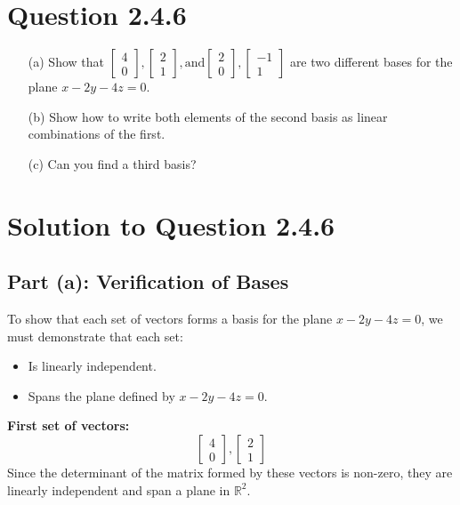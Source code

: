 \documentclass[12pt]{article}
\begin{document}
\newpage
\section*{Question 2.4.6}
\begin{itemize}
    \item[(a)] Show that \(\begin{bmatrix} 4 \\ 0 \end{bmatrix}, \begin{bmatrix} 2 \\ 1 \end{bmatrix}, \text{and} \begin{bmatrix} 2 \\ 0 \end{bmatrix}, \begin{bmatrix} -1 \\ 1 \end{bmatrix}\) are two different bases for the plane \(x - 2y - 4z = 0\).
    \item[(b)] Show how to write both elements of the second basis as linear combinations of the first.
    \item[(c)] Can you find a third basis?
\end{itemize}

\section*{Solution to Question 2.4.6}

\subsection*{Part (a): Verification of Bases}
To show that each set of vectors forms a basis for the plane \(x - 2y - 4z = 0\), we must demonstrate that each set:
\begin{itemize}
    \item Is linearly independent.
    \item Spans the plane defined by \(x - 2y - 4z = 0\).
\end{itemize}

\textbf{First set of vectors:}
\[
\begin{bmatrix} 4 \\ 0 \end{bmatrix}, \begin{bmatrix} 2 \\ 1 \end{bmatrix}
\]
Since the determinant of the matrix formed by these vectors is non-zero, they are linearly independent and span a plane in \(\mathbb{R}^2\).
\end{document}
